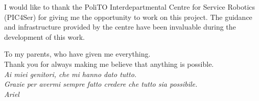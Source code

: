 I would like to thank the PoliTO Interdepartmental Centre for Service Robotics (PIC4Ser) for giving me the opportunity to work on this project. The guidance and infrastructure provided by the centre have been invaluable during the development of this work.
\vspace*{5\baselineskip}
\begin{flushright}
    To my parents, who have given me everything.\\
    Thank you for always making me believe that anything is possible.\\
    \textit{{Ai miei genitori, che mi hanno dato tutto.\\ 
    Grazie per avermi sempre fatto credere che tutto sia possibile.}} \\[\baselineskip]
    \textit{Ariel}
\end{flushright}
